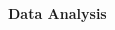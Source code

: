 \documentclass[11pt]{article}
\begin{document}
\begin{multicols}{2}


    

    \vspace{10pt}

     \selectfont \textbf{Data Analysis}
    
     \selectfont 
    


\end{multicols}
\end{document}
